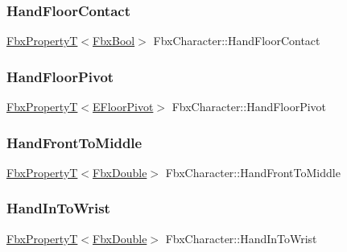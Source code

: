 \subsubsection{\texorpdfstring{Hand\+Floor\+Contact}{HandFloorContact}}
{\footnotesize\ttfamily \hyperlink{class_fbx_property_t}{Fbx\+PropertyT}$<$\hyperlink{fbxtypes_8h_a92e0562b2fe33e76a242f498b362262e}{Fbx\+Bool}$>$ Fbx\+Character\+::\+Hand\+Floor\+Contact}

\mbox{\label{class_fbx_character_a3386b370bba6a28b9966ae949e2c3f44}} 
\subsubsection{\texorpdfstring{Hand\+Floor\+Pivot}{HandFloorPivot}}
{\footnotesize\ttfamily \hyperlink{class_fbx_property_t}{Fbx\+PropertyT}$<$\hyperlink{class_fbx_character_a565c1e424493adecfa38e0dcdd17106e}{E\+Floor\+Pivot}$>$ Fbx\+Character\+::\+Hand\+Floor\+Pivot}

\mbox{\label{class_fbx_character_a8b85a6d7fca56d23eb56d5ad92c63385}} 
\subsubsection{\texorpdfstring{Hand\+Front\+To\+Middle}{HandFrontToMiddle}}
{\footnotesize\ttfamily \hyperlink{class_fbx_property_t}{Fbx\+PropertyT}$<$\hyperlink{fbxtypes_8h_a171e72a1c46fc15c1a6c9c31948c1c5b}{Fbx\+Double}$>$ Fbx\+Character\+::\+Hand\+Front\+To\+Middle}

\mbox{\label{class_fbx_character_a1c2c2abe75a505a4dbaa7a303d44d0a5}} 
\subsubsection{\texorpdfstring{Hand\+In\+To\+Wrist}{HandInToWrist}}
{\footnotesize\ttfamily \hyperlink{class_fbx_property_t}{Fbx\+PropertyT}$<$\hyperlink{fbxtypes_8h_a171e72a1c46fc15c1a6c9c31948c1c5b}{Fbx\+Double}$>$ Fbx\+Character\+::\+Hand\+In\+To\+Wrist}

